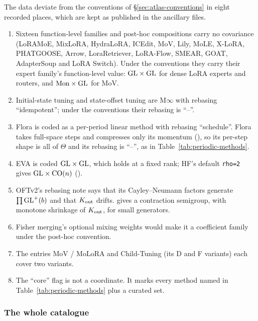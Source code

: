 The data deviate from the conventions of \S\ref{sec:atlas-conventions} in eight recorded places, which are kept as
published in the ancillary files.
\begin{enumerate}[label=(\arabic*)]
  \item Sixteen function-level families and post-hoc compositions carry no covariance (LoRAMoE, MixLoRA, HydraLoRA,
  ICEdit, MoV, Lily, MoLE, X-LoRA, PHATGOOSE, Arrow, LoraRetriever, LoRA-Flow, SMEAR, GOAT, AdapterSoup and LoRA
  Switch). Under the conventions they carry their expert family's function-level value: $\mathrm{GL}\times\mathrm{GL}$ for dense LoRA
  experts and routers, and $\mathrm{Mon}\times\mathrm{GL}$ for MoV.
  \item Initial-state tuning and state-offset tuning are M$\infty$ with rebasing ``idempotent''; under the conventions
  their rebasing is ``--''.
  \item Flora is coded as a per-period linear method with rebasing ``schedule''. Flora takes full-space steps and
  compresses only its momentum (), so its per-step shape is all of $\Theta$ and its rebasing
  is ``--'', as in Table~\ref{tab:periodic-methods}.
  \item EVA is coded $\mathrm{GL}\times\mathrm{GL}$, which holds at a fixed rank; HF's default \texttt{rho=2} gives $\mathrm{GL}\times\mathrm{CO}(n)$
  ().
  \item OFTv2's rebasing note says that its Cayley--Neumann factors generate $\prod\mathrm{GL}^+(b)$ and that $K_{\rm out}$
  drifts.  gives a contraction semigroup, with monotone shrinkage of $K_{\rm out}$, for small
  generators.
  \item Fisher merging's optional mixing weights would make it a coefficient family under the post-hoc convention.
  \item The entries MoV / MoLoRA and Child-Tuning (its D and F variants) each cover two variants.
  \item The ``core'' flag is not a coordinate. It marks every method named in Table~\ref{tab:periodic-methods} plus a
  curated set.
\end{enumerate}

\subsubsection{The whole catalogue}\label{sec:atlas-catalogue}

